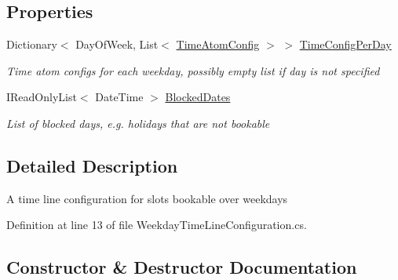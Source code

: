 \subsection*{Properties}
\begin{DoxyCompactItemize}
\item 
Dictionary$<$ Day\+Of\+Week, List$<$ \hyperlink{class_general_health_care_elements_1_1_booking_models_1_1_time_atom_config}{Time\+Atom\+Config} $>$ $>$ \hyperlink{class_general_health_care_elements_1_1_booking_models_1_1_per_weekday_time_line_configuration_a3b22c39fd099d2f55e973d4c0d538393}{Time\+Config\+Per\+Day}
\begin{DoxyCompactList}\small\item\em Time atom configs for each weekday, possibly empty list if day is not specified \end{DoxyCompactList}\item 
I\+Read\+Only\+List$<$ Date\+Time $>$ \hyperlink{class_general_health_care_elements_1_1_booking_models_1_1_per_weekday_time_line_configuration_adecb01fb7b2ceb94db813389bd5545ff}{Blocked\+Dates}
\begin{DoxyCompactList}\small\item\em List of blocked days, e.\+g. holidays that are not bookable \end{DoxyCompactList}\end{DoxyCompactItemize}


\subsection{Detailed Description}
A time line configuration for slots bookable over weekdays 



Definition at line 13 of file Weekday\+Time\+Line\+Configuration.\+cs.



\subsection{Constructor \& Destructor Documentation}
